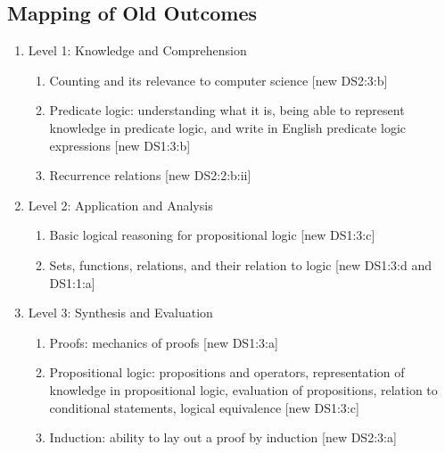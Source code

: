 \documentclass[11pt]{article}
\begin{document}
\begin{appendix}
\clearpage
\section{Mapping of Old Outcomes}
\label{app:oldOutcomeMapping}
\begin{enumerate}
\item	Level 1: Knowledge and Comprehension 
\begin{enumerate}
\item	Counting and its relevance to computer science {\color{red}[new DS2:3:b]}
\item	Predicate logic: understanding what it is, being able to represent knowledge in 
predicate logic, and write in English predicate logic expressions {\color{red}[new DS1:3:b]}
\item	Recurrence relations {\color{red}[new DS2:2:b:ii]}
\end{enumerate}
\item	Level 2: Application and Analysis 
\begin{enumerate}
\item	Basic logical reasoning for propositional logic {\color{red}[new DS1:3:c]}
\item	Sets, functions, relations, and their relation to logic {\color{red}[new DS1:3:d and DS1:1:a]}
\end{enumerate}
\item	Level 3: Synthesis and Evaluation
\begin{enumerate} 
\item	Proofs: mechanics of proofs {\color{red}[new DS1:3:a]}
\item	Propositional logic: propositions and operators, representation of knowledge in 
propositional logic, evaluation of propositions, relation to conditional statements, 
logical equivalence {\color{red}[new DS1:3:c]}
\item	Induction: ability to lay out a proof by induction {\color{red}[new DS2:3:a]}
\end{enumerate}
\end{enumerate}

\end{appendix}
\end{document}
